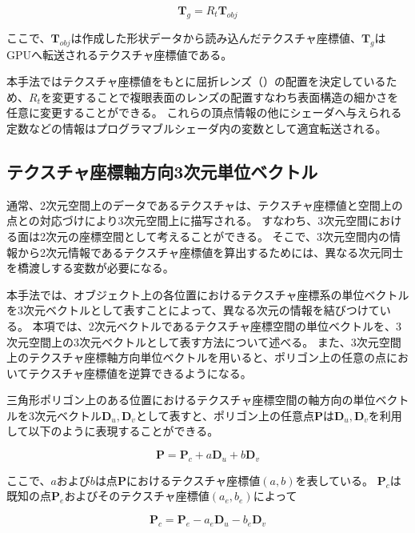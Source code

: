 \begin{equation}
{\bm T_g} = R_t{\bm T_{obj}}
\end{equation}

\noindent
ここで、$\bm{T}_{obj}$は作成した形状データから読み込んだテクスチャ座標値、$\bm{T}_g$はGPUへ転送されるテクスチャ座標値である。

本手法ではテクスチャ座標値をもとに屈折レンズ（）の配置を決定しているため、$R_t$を変更することで複眼表面のレンズの配置すなわち表面構造の細かさを任意に変更することができる。
これらの頂点情報の他にシェーダへ与えられる定数などの情報はプログラマブルシェーダ内の変数として適宜転送される。

\subsection{テクスチャ座標軸方向3次元単位ベクトル}
\label{SSUnitvec}

通常、2次元空間上のデータであるテクスチャは、テクスチャ座標値と空間上の点との対応づけにより3次元空間上に描写される。
すなわち、3次元空間における面は2次元の座標空間として考えることができる\figref{}。
そこで、3次元空間内の情報から2次元情報であるテクスチャ座標値を算出するためには、異なる次元同士を橋渡しする変数が必要になる。

本手法では、オブジェクト上の各位置におけるテクスチャ座標系の単位ベクトルを3次元ベクトルとして表すことによって、異なる次元の情報を結びつけている。
本項では、2次元ベクトルであるテクスチャ座標空間の単位ベクトルを、3次元空間上の3次元ベクトルとして表す方法について述べる。
また、3次元空間上のテクスチャ座標軸方向単位ベクトルを用いると、ポリゴン上の任意の点においてテクスチャ座標値を逆算できるようになる。

三角形ポリゴン上のある位置におけるテクスチャ座標空間の軸方向の単位ベクトルを3次元ベクトル$\bm{D}_u, \bm{D}_v$として表すと、ポリゴン上の任意点$\bm{P}$は$\bm{D}_u, \bm{D}_v$を利用して以下のように表現することができる。

\begin{equation}
\bm{P} = \bm{P}_c + a\bm{D}_u + b\bm{D}_v
\label{EPuv}
\end{equation}

\noindent
ここで、$a$および$b$は点$\bm{P}$におけるテクスチャ座標値$(a, b)$を表している。
$\bm{P}_c$は既知の点$\bm{P}_e$およびそのテクスチャ座標値$(a_e, b_e)$によって

\begin{equation}
\bm{P}_c = \bm{P}_e - a_e\bm{D}_u - b_e\bm{D}_v
\label{EPc}
\end{equation}

